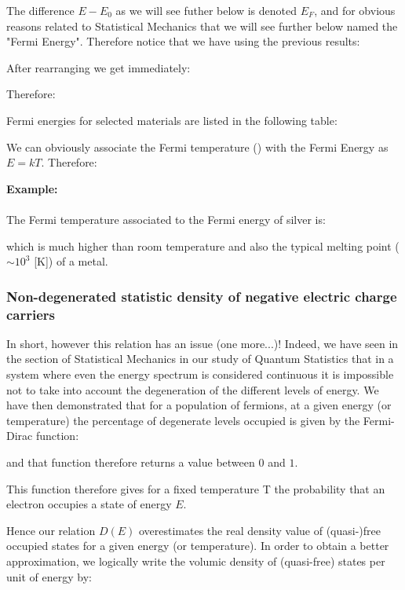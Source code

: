 	The difference $E-E_0$ as we will see futher below is denoted $E_F$, and for obvious reasons related to Statistical Mechanics that we will see further below named the "Fermi Energy". Therefore notice that we have using the previous results:
	
	After rearranging we get immediately:
	
	Therefore:
	
	Fermi energies for selected materials are listed in the following table:
	
	We can obviously associate the Fermi temperature () with the Fermi Energy as $E=kT$. Therefore:
	
	\begin{tcolorbox}[colframe=black,colback=white,sharp corners]
	\textbf{{\Large {}}Example:}\\\\
	The Fermi temperature associated to the Fermi energy of silver is:
	
	which is much higher than room temperature and also the typical melting point ($\sim 10^3$ [K]) of a metal.
	\end{tcolorbox}
	
	\subsubsection{Non-degenerated statistic density of negative electric charge carriers}
	In short, however this relation has an issue (one more...)! Indeed, we have seen in the section of Statistical Mechanics in our study of Quantum Statistics that in a system where even the energy spectrum is considered continuous it is impossible not to take into account the degeneration of the different levels of energy. We have then demonstrated that for a population of fermions, at a given energy (or temperature) the percentage of degenerate levels occupied is given by the Fermi-Dirac function:
	
	and that function therefore returns a value between $0$ and $1$.

This function therefore gives for a fixed temperature T the probability that an electron occupies a state of energy $E$.

Hence our relation $D(E)$ overestimates the real density value of (quasi-)free occupied states for a given energy (or temperature). In order to obtain a better approximation, we logically write the volumic density of (quasi-free) states per unit of energy by:
	
